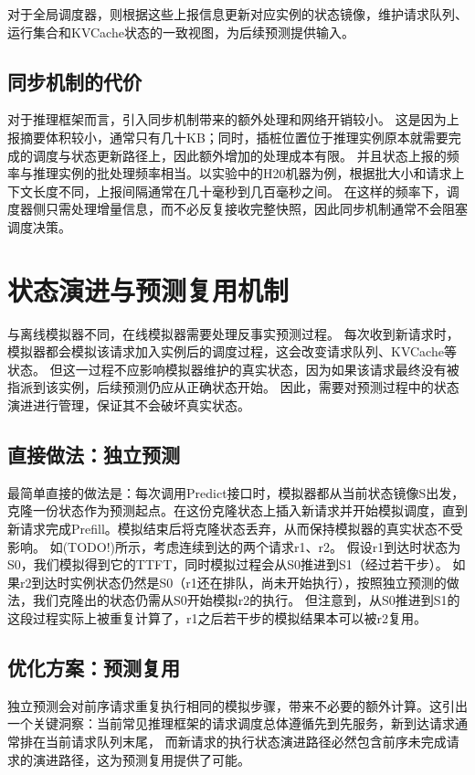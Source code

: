对于全局调度器，则根据这些上报信息更新对应实例的状态镜像，维护请求队列、运行集合和KVCache状态的一致视图，为后续预测提供输入。

\subsection{同步机制的代价}
对于推理框架而言，引入同步机制带来的额外处理和网络开销较小。
这是因为上报摘要体积较小，通常只有几十KB；同时，插桩位置位于推理实例原本就需要完成的调度与状态更新路径上，因此额外增加的处理成本有限。
并且状态上报的频率与推理实例的批处理频率相当。以实验中的H20机器为例，根据批大小和请求上下文长度不同，上报间隔通常在几十毫秒到几百毫秒之间。
在这样的频率下，调度器侧只需处理增量信息，而不必反复接收完整快照，因此同步机制通常不会阻塞调度决策。


\section{状态演进与预测复用机制}
与离线模拟器不同，在线模拟器需要处理反事实预测过程。
每次收到新请求时，模拟器都会模拟该请求加入实例后的调度过程，这会改变请求队列、KVCache等状态。
但这一过程不应影响模拟器维护的真实状态，因为如果该请求最终没有被指派到该实例，后续预测仍应从正确状态开始。
因此，需要对预测过程中的状态演进进行管理，保证其不会破坏真实状态。

\subsection{直接做法：独立预测}

最简单直接的做法是：每次调用Predict接口时，模拟器都从当前状态镜像S出发，克隆一份状态作为预测起点。在这份克隆状态上插入新请求并开始模拟调度，直到新请求完成Prefill。模拟结束后将克隆状态丢弃，从而保持模拟器的真实状态不受影响。
如(TODO!)所示，考虑连续到达的两个请求r1、r2。
假设r1到达时状态为S0，我们模拟得到它的TTFT，同时模拟过程会从S0推进到S1（经过若干步）。
如果r2到达时实例状态仍然是S0（r1还在排队，尚未开始执行），按照独立预测的做法，我们克隆出的状态仍需从S0开始模拟r2的执行。
但注意到，从S0推进到S1的这段过程实际上被重复计算了，r1之后若干步的模拟结果本可以被r2复用。

\subsection{优化方案：预测复用}
独立预测会对前序请求重复执行相同的模拟步骤，带来不必要的额外计算。这引出一个关键洞察：当前常见推理框架的请求调度总体遵循先到先服务，新到达请求通常排在当前请求队列末尾，
而新请求的执行状态演进路径必然包含前序未完成请求的演进路径，这为预测复用提供了可能。

